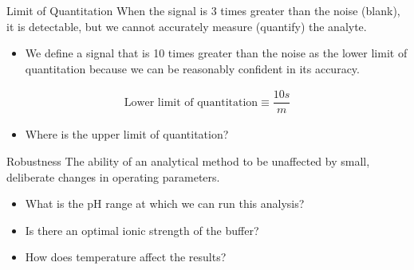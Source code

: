 \documentclass[notes=show]{beamer}
\begin{document}
\begin{frame}{Limit of Quantitation}
		When the signal is 3 times greater than the noise (blank),
			it is detectable, but we cannot accurately measure
			(quantify) the analyte.
	\begin{itemize}
		\item We define a signal that is 10 times greater than the noise
			as the \alert{lower limit of quantitation} because we
			can be \alert{reasonably} confident in its accuracy.
	\end{itemize}

	\begin{align*}
		\text{Lower limit of quantitation} \equiv \dfrac{10s}{m}
	\end{align*}

	\begin{itemize}
		\item Where is the upper limit of quantitation?
	\end{itemize}
\end{frame}

\begin{frame}{Robustness}
	The ability of an analytical method to be unaffected by small,
	deliberate changes in operating parameters.

	\begin{itemize}
		\item What is the pH range at which we can run this analysis?
		\item Is there an optimal ionic strength of the buffer?
		\item How does temperature affect the results?
	\end{itemize}
\end{frame}



\end{document}
